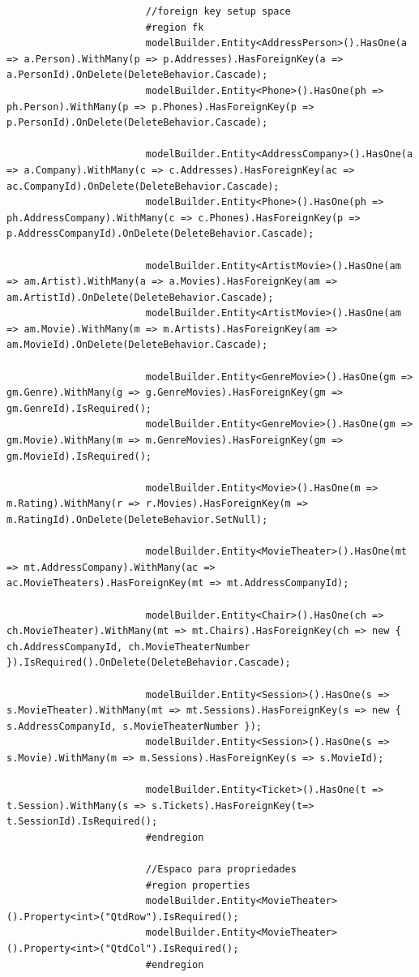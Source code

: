 \documentclass[a4paper,10pt]{article}
\begin{document}
\begin{lstlisting}
						//foreign key setup space
						#region fk
						modelBuilder.Entity<AddressPerson>().HasOne(a => a.Person).WithMany(p => p.Addresses).HasForeignKey(a => a.PersonId).OnDelete(DeleteBehavior.Cascade);
						modelBuilder.Entity<Phone>().HasOne(ph => ph.Person).WithMany(p => p.Phones).HasForeignKey(p => p.PersonId).OnDelete(DeleteBehavior.Cascade);

						modelBuilder.Entity<AddressCompany>().HasOne(a => a.Company).WithMany(c => c.Addresses).HasForeignKey(ac => ac.CompanyId).OnDelete(DeleteBehavior.Cascade);
						modelBuilder.Entity<Phone>().HasOne(ph => ph.AddressCompany).WithMany(c => c.Phones).HasForeignKey(p => p.AddressCompanyId).OnDelete(DeleteBehavior.Cascade);

						modelBuilder.Entity<ArtistMovie>().HasOne(am => am.Artist).WithMany(a => a.Movies).HasForeignKey(am => am.ArtistId).OnDelete(DeleteBehavior.Cascade);
						modelBuilder.Entity<ArtistMovie>().HasOne(am => am.Movie).WithMany(m => m.Artists).HasForeignKey(am => am.MovieId).OnDelete(DeleteBehavior.Cascade);

						modelBuilder.Entity<GenreMovie>().HasOne(gm => gm.Genre).WithMany(g => g.GenreMovies).HasForeignKey(gm => gm.GenreId).IsRequired();
						modelBuilder.Entity<GenreMovie>().HasOne(gm => gm.Movie).WithMany(m => m.GenreMovies).HasForeignKey(gm => gm.MovieId).IsRequired();

						modelBuilder.Entity<Movie>().HasOne(m => m.Rating).WithMany(r => r.Movies).HasForeignKey(m => m.RatingId).OnDelete(DeleteBehavior.SetNull);

						modelBuilder.Entity<MovieTheater>().HasOne(mt => mt.AddressCompany).WithMany(ac => ac.MovieTheaters).HasForeignKey(mt => mt.AddressCompanyId);

						modelBuilder.Entity<Chair>().HasOne(ch => ch.MovieTheater).WithMany(mt => mt.Chairs).HasForeignKey(ch => new { ch.AddressCompanyId, ch.MovieTheaterNumber }).IsRequired().OnDelete(DeleteBehavior.Cascade);

						modelBuilder.Entity<Session>().HasOne(s => s.MovieTheater).WithMany(mt => mt.Sessions).HasForeignKey(s => new { s.AddressCompanyId, s.MovieTheaterNumber });
						modelBuilder.Entity<Session>().HasOne(s => s.Movie).WithMany(m => m.Sessions).HasForeignKey(s => s.MovieId);

						modelBuilder.Entity<Ticket>().HasOne(t => t.Session).WithMany(s => s.Tickets).HasForeignKey(t=> t.SessionId).IsRequired();
						#endregion

						//Espaco para propriedades
						#region properties
						modelBuilder.Entity<MovieTheater>().Property<int>("QtdRow").IsRequired();
						modelBuilder.Entity<MovieTheater>().Property<int>("QtdCol").IsRequired();
						#endregion


\end{lstlisting}
\end{document}
